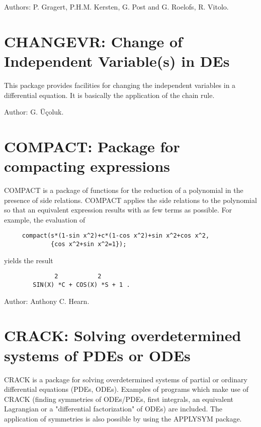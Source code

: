 Authors: P. Gragert, P.H.M. Kersten, G. Post and G. Roelofs, R. Vitolo.


\newpage

\section{CHANGEVR: Change of Independent Variable(s) in DEs}

This package provides facilities for changing the independent variables in
a differential equation. It is basically the application of the chain rule.

Author: G. \"{U}\c{c}oluk.


\newpage

\section{COMPACT: Package for compacting expressions} 

COMPACT is a package of functions for the reduction of a polynomial in the
presence of side relations.  COMPACT applies the side relations to the
polynomial so that an equivalent expression results with as few terms as
possible.  For example, the evaluation of
\begin{verbatim}
     compact(s*(1-sin x^2)+c*(1-cos x^2)+sin x^2+cos x^2,
             {cos x^2+sin x^2=1});
\end{verbatim}
yields the result\pagebreak[1]
\begin{samepage}
\begin{verbatim}
              2           2
        SIN(X) *C + COS(X) *S + 1 .
\end{verbatim}

Author:  Anthony C. Hearn.
\end{samepage}

\newpage

\section{CRACK: Solving overdetermined systems of PDEs or ODEs}

CRACK is a package for solving overdetermined systems of partial or
ordinary differential equations (PDEs, ODEs).  Examples of programs which
make use of CRACK (finding symmetries of ODEs/PDEs, first integrals, an
equivalent Lagrangian or a "differential factorization" of ODEs) are
included.  The application of symmetries is also possible by using the
APPLYSYM package.

